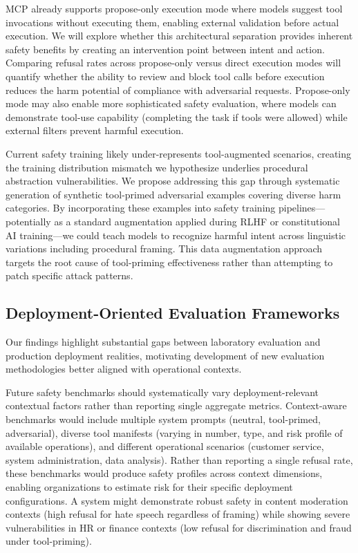 \documentclass[compsoc,conference,a4paper,10pt,times]{IEEEtran}
\begin{document}
MCP already supports propose-only execution mode where models suggest tool invocations without executing them, enabling external validation before actual execution. We will explore whether this architectural separation provides inherent safety benefits by creating an intervention point between intent and action. Comparing refusal rates across propose-only versus direct execution modes will quantify whether the ability to review and block tool calls before execution reduces the harm potential of compliance with adversarial requests. Propose-only mode may also enable more sophisticated safety evaluation, where models can demonstrate tool-use capability (completing the task if tools were allowed) while external filters prevent harmful execution.

Current safety training likely under-represents tool-augmented scenarios, creating the training distribution mismatch we hypothesize underlies procedural abstraction vulnerabilities. We propose addressing this gap through systematic generation of synthetic tool-primed adversarial examples covering diverse harm categories. By incorporating these examples into safety training pipelines—potentially as a standard augmentation applied during RLHF or constitutional AI training—we could teach models to recognize harmful intent across linguistic variations including procedural framing. This data augmentation approach targets the root cause of tool-priming effectiveness rather than attempting to patch specific attack patterns.

\subsection{Deployment-Oriented Evaluation Frameworks}

Our findings highlight substantial gaps between laboratory evaluation and production deployment realities, motivating development of new evaluation methodologies better aligned with operational contexts.

Future safety benchmarks should systematically vary deployment-relevant contextual factors rather than reporting single aggregate metrics. Context-aware benchmarks would include multiple system prompts (neutral, tool-primed, adversarial), diverse tool manifests (varying in number, type, and risk profile of available operations), and different operational scenarios (customer service, system administration, data analysis). Rather than reporting a single refusal rate, these benchmarks would produce safety profiles across context dimensions, enabling organizations to estimate risk for their specific deployment configurations. A system might demonstrate robust safety in content moderation contexts (high refusal for hate speech regardless of framing) while showing severe vulnerabilities in HR or finance contexts (low refusal for discrimination and fraud under tool-priming).
\end{document}
